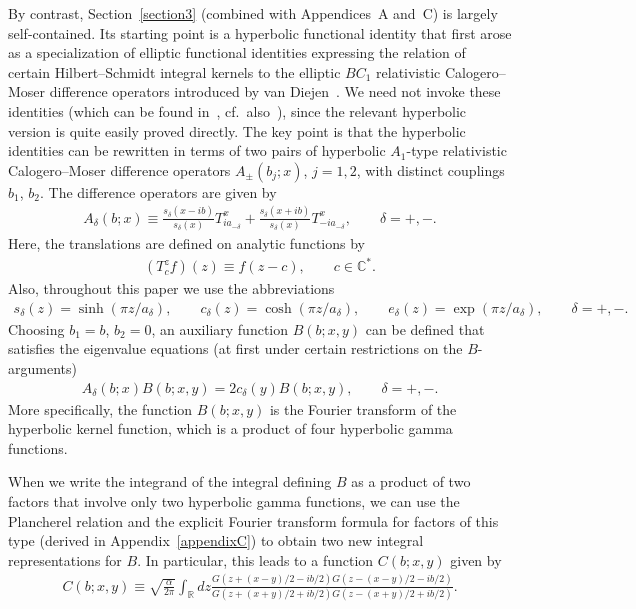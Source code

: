 \documentclass[11pt]{article}
\numberwithin{equation}{section}
\newcommand{\de}{\delta}
\newcommand{\C}{{\mathbb C}}
\newcommand{\R}{{\mathbb R}}
\begin{document}
By contrast, Section~\ref{section3} (combined with Appendices~A and~C) is largely self-contained. Its starting point is a hyperbolic functional identity that f\/irst arose as a specialization of elliptic functional identities expressing the relation of certain Hilbert--Schmidt integral kernels to the elliptic $BC_1$ relativistic Calogero--Moser dif\/ference operators introduced by van Diejen~\cite{diej}. We need not invoke these identities (which can be found in~\cite{HSI}, cf.~also~\cite{noum}), since the relevant hyperbolic version is quite easily proved directly. The key point is that the hyperbolic identities can be rewritten in terms of two pairs of hyperbolic $A_1$-type relativistic Calogero--Moser dif\/fe\-rence operators $A_{\pm}(b_j;x)$, $j=1,2$, with distinct couplings $b_1$, $b_2$. The dif\/ference operators are given by
\begin{gather}\label{Apm}
A_{\de}(b;x)\equiv \frac{s_{\de}(x-ib)}{s_{\de}(x)}T^x_{ia_{-\de}}+\frac{s_{\de}(x+ib)}{s_{\de}(x)}T^x_{-ia_{-\de}},\qquad \de=+,-.
\end{gather}
Here, the translations are def\/ined on analytic functions by
\begin{gather}\label{Tdef}
(T^z_cf)(z)\equiv f(z-c),\qquad c\in\C^{*}.
\end{gather}
Also, throughout this paper we use the abbreviations
\begin{gather}\label{denot}
s_{\de}(z)=\sinh(\pi z/a_{\de}),\! \qquad c_{\de}(z)=\cosh(\pi z/a_{\de}),\! \qquad e_{\de}(z)=\exp(\pi z/a_{\de}),\! \qquad \de=+,-.\!\!
\end{gather}
Choosing $b_1=b$, $b_2=0$, an auxiliary function $B(b;x,y)$ can be def\/ined that satisf\/ies the eigenvalue equations (at f\/irst under certain restrictions on the $B$-arguments)
\begin{gather}\label{AdeB}
A_{\de}(b;x)B(b;x,y)=2c_{\de}(y)B(b;x,y),\qquad \de=+,-.
\end{gather}
 More specif\/ically, the function $B(b;x,y)$ is the Fourier transform of the hyperbolic kernel function, which is a product of four hyperbolic gamma functions.

When we write the integrand of the integral def\/ining $B$ as a product of two factors that involve only two hyperbolic gamma functions, we can use the Plancherel relation and the explicit Fourier transform formula for factors of this type (derived in Appendix~\ref{appendixC}) to obtain two new integral representations for $B$.  In particular, this leads to a function $C(b;x,y)$ given by
\begin{gather}\label{defC}
C(b;x,y)\equiv \sqrt{\frac{\alpha}{2\pi}}\int_{\R}dz \frac{G(z+ (x-y)/2-ib/2)G(z- (x-y)/2-ib/2)}{G(z+ (x+y)/2+ib/2)G(z- (x+y)/2+ib/2)}.
\end{gather}
\end{document}
